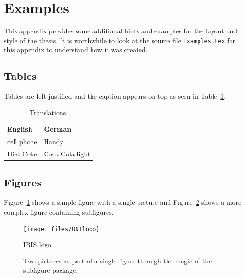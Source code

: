 \section{Examples}
\label{s:Examples}

This appendix provides some additional hints and examples for the
layout and style of the thesis. It is worthwhile to look at the source
file \verb|Examples.tex| for this appendix to understand how it was
created.



\subsection{Tables}

Tables are left justified and the caption appears on top as seen in
Table~\ref{t:Translations}.

\begin{table}[ht] %
\caption[Translations]{\label{t:Translations}Translations.}
\centering
\begin{tabular}{ll}
\hline
\textbf{English} & \textbf{German}\\
\hline
cell phone       & Handy\\
Diet Coke        & Coca Cola light\\
\hline
\end{tabular}
\end{table}



\subsection{Figures}

Figure~\ref{f:IRISlogo} shows a simple figure with a single picture
and Figure~\ref{f:SubfigureExample} shows a more complex figure
containing subfigures.

\begin{figure}[ht]
\centering
\texttt{[image: files/UNIlogo]}
\caption[IRIS logo]{\label{f:IRISlogo}IRIS logo.}
\end{figure}

\begin{figure}[ht]
\centering
{}\quad
{}
\caption[Subfigure example]{\label{f:SubfigureExample}Two pictures as
  part of a single figure through the magic of the subfigure package.}
\end{figure}



